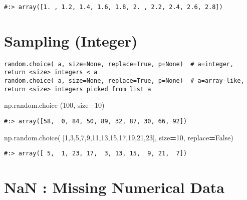 \documentclass[
]{book}
\newenvironment{Shaded}{\begin{snugshade}}{\end{snugshade}}
\newcommand{\DecValTok}[1]{\textcolor[rgb]{0.06,0.06,0.06}{#1}}
\newcommand{\NormalTok}[1]{#1}
\newcommand{\OperatorTok}[1]{\textcolor[rgb]{0.43,0.43,0.43}{\textbf{#1}}}
\newcommand{\VariableTok}[1]{\textcolor[rgb]{0,0,0}{#1}}
\begin{document}
\begin{verbatim}
#:> array([1. , 1.2, 1.4, 1.6, 1.8, 2. , 2.2, 2.4, 2.6, 2.8])
\end{verbatim}

\hypertarget{sampling-integer}{%
\section{Sampling (Integer)}\label{sampling-integer}}

\begin{verbatim}
random.choice( a, size=None, replace=True, p=None)  # a=integer, return <size> integers < a
random.choice( a, size=None, replace=True, p=None)  # a=array-like, return <size> integers picked from list a
\end{verbatim}

\begin{Shaded}
\begin{Highlighting}[]
\NormalTok{np.random.choice (}\DecValTok{100}\NormalTok{, size}\OperatorTok{=}\DecValTok{10}\NormalTok{)}
\end{Highlighting}
\end{Shaded}

\begin{verbatim}
#:> array([58,  0, 84, 50, 89, 32, 87, 30, 66, 92])
\end{verbatim}

\begin{Shaded}
\begin{Highlighting}[]
\NormalTok{np.random.choice( [}\DecValTok{1}\NormalTok{,}\DecValTok{3}\NormalTok{,}\DecValTok{5}\NormalTok{,}\DecValTok{7}\NormalTok{,}\DecValTok{9}\NormalTok{,}\DecValTok{11}\NormalTok{,}\DecValTok{13}\NormalTok{,}\DecValTok{15}\NormalTok{,}\DecValTok{17}\NormalTok{,}\DecValTok{19}\NormalTok{,}\DecValTok{21}\NormalTok{,}\DecValTok{23}\NormalTok{], size}\OperatorTok{=}\DecValTok{10}\NormalTok{, replace}\OperatorTok{=}\VariableTok{False}\NormalTok{)}
\end{Highlighting}
\end{Shaded}

\begin{verbatim}
#:> array([ 5,  1, 23, 17,  3, 13, 15,  9, 21,  7])
\end{verbatim}

\hypertarget{nan-missing-numerical-data}{%
\section{NaN : Missing Numerical Data}\label{nan-missing-numerical-data}}
\end{document}
